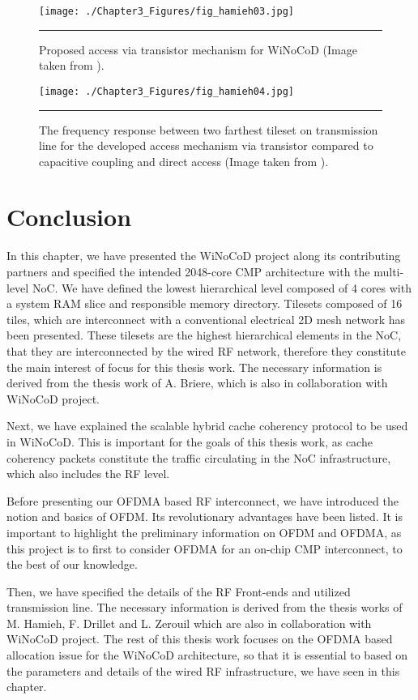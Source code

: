 \begin{figure}[htbp]
  \centering
    \texttt{[image: ./Chapter3\_Figures/fig\_hamieh03.jpg]}
    \rule{35em}{0.5pt}
  \caption[Proposed access via transistor mechanism for WiNoCoD.]{Proposed access via transistor mechanism for WiNoCoD (Image taken from \cite{hamieh2014sizing}).}
  \label{fig:Electron}
\end{figure}


\begin{figure}[htbp]
  \centering
    \texttt{[image: ./Chapter3\_Figures/fig\_hamieh04.jpg]}
    \rule{35em}{0.5pt}
  \caption[transmission and reception RF interface]{The frequency response between two farthest tileset on transmission line for the developed access mechanism via transistor compared to capacitive coupling and direct access (Image taken from \cite{hamieh2014sizing}).}
  \label{fig:Electron}
\end{figure}



\section{Conclusion}

In this chapter, we have presented the WiNoCoD project along its contributing partners and specified the intended 2048-core CMP architecture with the multi-level NoC. We have defined the lowest hierarchical level composed of 4 cores with a system RAM slice and responsible memory directory. Tilesets composed of 16 tiles, which are interconnect with a conventional electrical 2D mesh network has been presented. These tilesets are the highest hierarchical elements in the NoC, that they are interconnected by the wired RF network, therefore they constitute the main interest of focus for this thesis work. The necessary information is derived from the thesis work of A. Briere, which is also in collaboration with WiNoCoD project. 

Next, we have explained the scalable hybrid cache coherency protocol to be used in WiNoCoD. This is important for the goals of this thesis work, as cache coherency packets constitute the traffic circulating in the NoC infrastructure, which also includes the RF level.

Before presenting our OFDMA based RF interconnect, we have introduced the notion and basics of OFDM. Its revolutionary advantages have been listed. It is important to highlight the preliminary information on OFDM and OFDMA, as this project is to first to consider OFDMA for an on-chip CMP interconnect, to the best of our knowledge.

Then, we have specified the details of the RF Front-ends and utilized transmission line. The necessary information is derived from the thesis works of M. Hamieh, F. Drillet and L. Zerouil which are also in collaboration with WiNoCoD project. The rest of this thesis work focuses on the OFDMA based allocation issue for the WiNoCoD architecture, so that it is essential to based on the parameters and details of the wired RF infrastructure, we have seen in this chapter.     